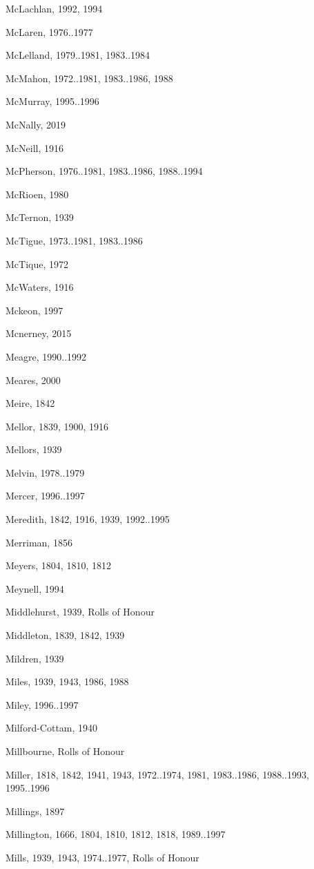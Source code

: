 \begin{theindex}
\item McLachlan, 1992, 1994
\item McLaren, 1976..1977
\item McLelland, 1979..1981, 1983..1984
\item McMahon, 1972..1981, 1983..1986, 1988
\item McMurray, 1995..1996
\item McNally, 2019
\item McNeill, 1916
\item McPherson, 1976..1981, 1983..1986, 1988..1994
\item McRioen, 1980
\item McTernon, 1939
\item McTigue, 1973..1981, 1983..1986
\item McTique, 1972
\item McWaters, 1916
\item Mckeon, 1997
\item Mcnerney, 2015
\item Meagre, 1990..1992
\item Meares, 2000
\item Meire, 1842
\item Mellor, 1839, 1900, 1916
\item Mellors, 1939
\item Melvin, 1978..1979
\item Mercer, 1996..1997
\item Meredith, 1842, 1916, 1939, 1992..1995
\item Merriman, 1856
\item Meyers, 1804, 1810, 1812
\item Meynell, 1994
\item Middlehurst, 1939, Rolls of Honour
\item Middleton, 1839, 1842, 1939
\item Mildren, 1939
\item Miles, 1939, 1943, 1986, 1988
\item Miley, 1996..1997
\item Milford-Cottam, 1940
\item Millbourne, Rolls of Honour
\item Miller, 1818, 1842, 1941, 1943, 1972..1974, 1981, 1983..1986, 1988..1993, 1995..1996
\item Millings, 1897
\item Millington, 1666, 1804, 1810, 1812, 1818, 1989..1997
\item Mills, 1939, 1943, 1974..1977, Rolls of Honour

\end{theindex}
